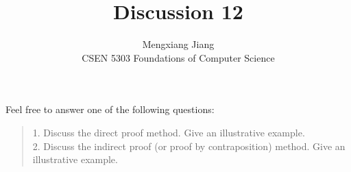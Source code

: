 \documentclass[12pt]{article}
\newenvironment{problem}[2][Problem]{\begin{trivlist}
\item[\hskip \labelsep {\bfseries #1}\hskip \labelsep {\bfseries #2.}]}{\end{trivlist}}
\begin{document}
 
 
\title{Discussion 12}%
\author{Mengxiang Jiang\\ %
CSEN 5303 Foundations of Computer Science} %
 
\maketitle

\begin{problem}{statement}
    Feel free to answer one of the following questions:
\begin{quote}
1. Discuss the direct proof method. Give an illustrative example.\\
2. Discuss the indirect proof (or proof by contraposition) method. Give an illustrative
example.
\end{quote}
\end{problem}
\end{document}
